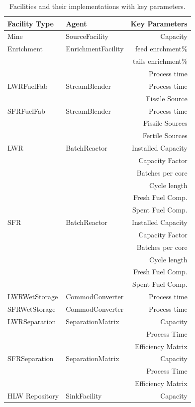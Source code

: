 \begin{table}[htbp!]
\centering
\begin{tabular}{|l|l|r|}
\hline
\textbf{Facility Type} &\textbf{Agent} & \textbf{Key Parameters}\\
\hline
Mine & SourceFacility & Capacity\\
\hline
Enrichment & EnrichmentFacility & feed enrchment\% \\
& & tails enrichment\% \\
& & Process time \\
\hline
LWRFuelFab & StreamBlender & Process time\\
& & Fissile Source\\
\hline
SFRFuelFab & StreamBlender  & Process time\\
& & Fissile Sources\\
& & Fertile Sources\\
\hline
LWR & BatchReactor & Installed Capacity \\
& & Capacity Factor \\
& & Batches per core \\ 
& & Cycle length\\
& & Fresh Fuel Comp. \\
& & Spent Fuel Comp. \\
\hline
SFR & BatchReactor & Installed Capacity\\
& & Capacity Factor \\
& & Batches per core \\ 
& & Cycle length\\
& & Fresh Fuel Comp. \\
& & Spent Fuel Comp. \\
\hline
LWRWetStorage & CommodConverter & Process time\\
\hline
SFRWetStorage & CommodConverter & Process time\\
\hline
LWRSeparation & SeparationMatrix & Capacity\\
& & Process Time\\
& & Efficiency Matrix\\
\hline
SFRSeparation & SeparationMatrix & Capacity\\
& & Process Time\\
& & Efficiency Matrix\\
\hline
HLW Repository & SinkFacility & Capacity \\
\hline
\end{tabular}
\caption{Facilities and their implementations with key parameters.}
\label{tab:facimpl}
\end{table}
\FloatBarrier

